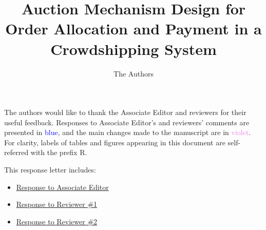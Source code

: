 \documentclass[12pt,american]{article}
\title{Auction Mechanism Design for Order Allocation and Payment in a Crowdshipping System}
\author{The Authors}
\newcommand{\added}[1]{\textcolor{violet}{#1}}
\begin{document}
\maketitle
The authors would like to thank the Associate Editor and reviewers for their useful feedback. Responses to Associate Editor's and reviewers' comments are presented in \textcolor{blue}{blue}, and the main changes made to the manuscript are in \added{violet}. For clarity, labels of tables and figures appearing in this document are self-referred with the prefix R. 
\vspace{.5em} 

This response letter includes:
\begin{itemize}[leftmargin=3em]
    \item \hyperlink{Response to AE}{Response to Associate Editor } 
    \item \hyperlink{Response to R1}{Response to Reviewer \#1 }
    \item \hyperlink{Response to R2}{Response to Reviewer \#2 }
\end{itemize}


\newpage
% 
\pagestyle{fancy}
\fancyfoot[R]{\thepage\ / \pageref{LastPage}}
\fancyfoot[C]{\ }



\end{document}
